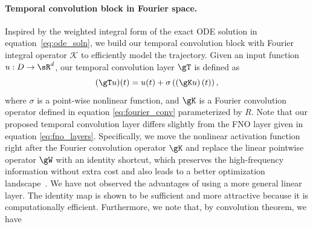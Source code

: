 \paragraph{Temporal convolution block in Fourier space.}
Inspired by the weighted integral form of the exact ODE solution in equation~\ref{eq:ode_soln}, we build our temporal convolution block with Fourier integral operator $\mathcal{K}$ to efficiently model the trajectory.  
Given an input function $u: D\rightarrow \sR^d$, our temporal convolution layer $\gT$ is defined as
\begin{equation}
    (\gT u)(t) = u(t) +  \sigma \left(\left(\gK u \right)(t)\right),
\end{equation}
where $\sigma$ is a point-wise nonlinear function, and $\gK$ is a Fourier convolution operator defined in equation \ref{eq:fourier_conv} parameterized by $R$. Note that our proposed temporal convolution layer differs slightly from the FNO layer given in equation \ref{eq:fno_layers}. 
Specifically, we move the nonlinear activation function  right after the Fourier convolution operator $\gK$ and replace the linear pointwise operator $\gW$ with an identity shortcut, which preserves the high-frequency information without extra cost and also leads to a better optimization landscape~\cite{he2016deep}. 
We have not observed the advantages of using a more general linear layer. The identity map is shown to be sufficient and more attractive because it is computationally efficient. Furthermore, we note that, by convolution theorem, we have 
